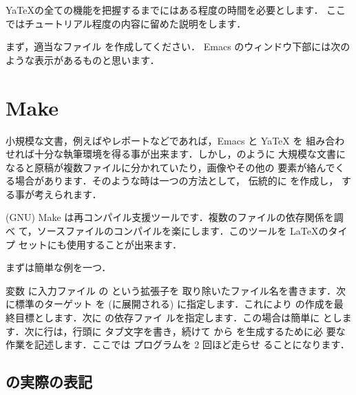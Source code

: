 
\begin{Prob}
 
Ya\TeX の全ての機能を把握するまでにはある程度の時間を必要とします．
ここではチュートリアル程度の内容に留めた説明をします．

まず，適当なファイル  を作成してください．
Emacs のウィンドウ下部には次のような表示があるものと思います．


\end{Prob}


\section{Make}
小規模な文書，例えばやレポートなどであれば，Emacs と YaTeX を
組み合わせれば十分な執筆環境を得る事が出来ます．しかし，のように
大規模な文書になると原稿が複数ファイルに分かれていたり，画像やその他の
要素が絡んでくる場合があります．そのような時は一つの方法として，
伝統的に  を作成し， する事が考えられます．

(GNU) Make は再コンパイル支援ツールです．複数のファイルの依存関係を調べ
て，ソースファイルのコンパイルを楽にします．このツールを \LaTeX のタイプ
セットにも使用することが出来ます．

まずは簡単な例を一つ．

変数  に入力ファイル  の  という拡張子を
取り除いたファイル名を書きます．次に標準のターゲット  を
 (に展開される) に指定します．これにより%
 の作成を最終目標とします．次に  の依存ファイ
ルを指定します．この場合は簡単に  とします．次に行は，行頭に
タブ文字を書き，続けて  から  を生成するために必
要な作業を記述します．ここでは  プログラムを 2 回ほど走らせ
ることになります．

\subsection{ の実際の表記 }

